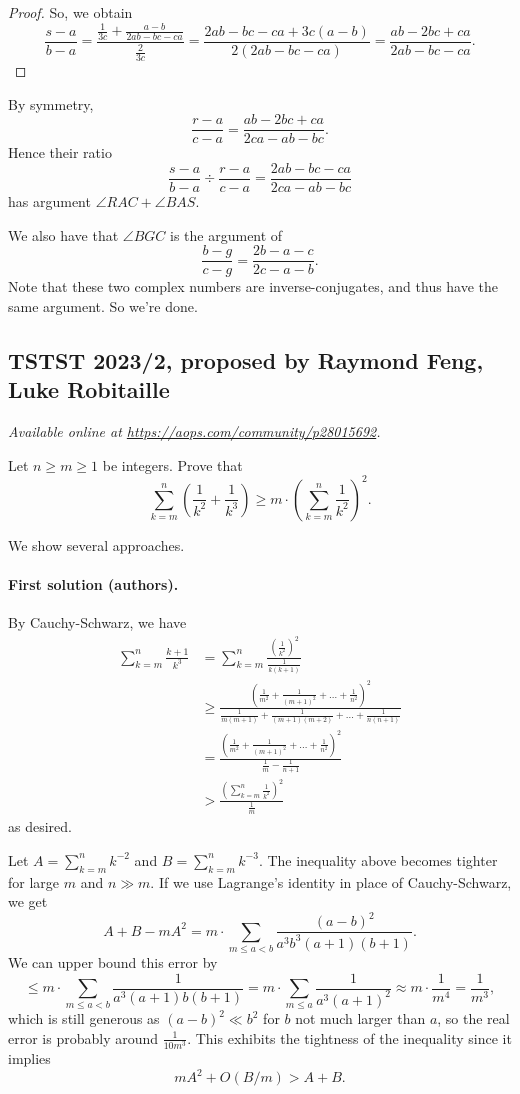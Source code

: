 \documentclass[11pt]{scrartcl}
\begin{document}
\begin{proof}
So, we obtain
\[
  \frac{s-a}{b-a}
  = \frac{\frac{1}{3c}+\frac{a-b}{2ab-bc-ca}}{\frac{2}{3c}}
  = \frac{2ab-bc-ca+3c(a-b)}{2(2ab-bc-ca)}=\frac{ab-2bc+ca}{2ab-bc-ca}.
\]
\end{proof}

By symmetry,
\[ \frac{r-a}{c-a}=\frac{ab-2bc+ca}{2ca-ab-bc}. \]
Hence their ratio
\[ \frac{s-a}{b-a} \div \frac{r-a}{c-a} = \frac{2ab-bc-ca}{2ca-ab-bc} \]
has argument $\angle RAC +\angle BAS$.

We also have that $\angle BGC$ is the argument of
\[ \frac{b-g}{c-g}=\frac{2b-a-c}{2c-a-b}. \]
Note that these two complex numbers are inverse-conjugates,
and thus have the same argument. So we're done.
\pagebreak

\subsection{TSTST 2023/2, proposed by Raymond Feng, Luke Robitaille}
\textsl{Available online at \url{https://aops.com/community/p28015692}.}
\begin{mdframed}[style=mdpurplebox,frametitle={Problem statement}]
Let $n \ge m \ge 1$ be integers.
Prove that
\[ \sum_{k=m}^n \left( \frac{1}{k^2} + \frac{1}{k^3} \right)
  \ge m \cdot \left( \sum_{k=m}^n \frac{1}{k^2} \right)^2. \]
\end{mdframed}
We show several approaches.

\paragraph{First solution (authors).}
By Cauchy-Schwarz, we have
\begin{align*}
  \sum_{k=m}^n\frac{k+1}{k^3}
  &= \sum_{k=m}^n\frac{\left(\frac1{k^2}\right)^2}{\frac1{k(k+1)}} \\
  &\geq
  \frac{
  \left( \frac{1}{m^2} + \frac{1}{(m+1)^2} + \dots + \frac{1}{n^2} \right)^2
  }
  {
    \frac{1}{m(m+1)} + \frac{1}{(m+1)(m+2)} + \dots + \frac{1}{n(n+1)}
  } \\
  &=
  \frac{
  \left( \frac{1}{m^2} + \frac{1}{(m+1)^2} + \dots + \frac{1}{n^2} \right)^2
  }
  { \frac 1m - \frac{1}{n+1} } \\
  &> \frac{\left(\sum_{k=m}^n\frac1{k^2}\right)^2}{\frac1m}
\end{align*}
as desired.

\begin{remark*}
  Let $A = \sum_{k=m}^n k^{-2}$ and $B = \sum_{k=m}^n k^{-3}$. The inequality
  above becomes tighter for large $m$ and $n \gg m$. If we use Lagrange's
  identity in place of Cauchy-Schwarz,
  we get \[ A+B-mA^2=m\cdot\sum_{m\leq a<b} \frac{(a-b)^2}{a^3b^3(a+1)(b+1)}.\]
  We can upper bound this error by
  \[
    \leq m\cdot\sum_{m\leq a<b}\frac1{a^3(a+1)b(b+1)}
    =m\cdot\sum_{m\leq a}\frac1{a^3(a+1)^2}
    \approx m\cdot\frac1{m^4} = \frac1{m^3},
  \]
  which is still generous as $(a-b)^2 \ll b^2$
  for $b$ not much larger than $a$,
  so the real error is probably around $\frac1{10m^3}$.
  This exhibits the tightness of the inequality since it implies
  \[ mA^2+O(B/m) > A+B. \]
\end{remark*}
\end{document}
